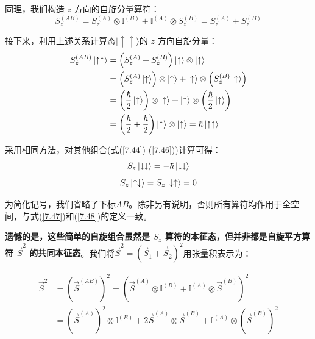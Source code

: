 同理，我们构造 $z$ 方向的自旋分量算符：
\begin{equation}
	S_z^{(AB)} = S_z^{(A)} \otimes \mathbb{I}^{(B)} + \mathbb{I}^{(A)} \otimes S_z^{(B)} = S_z^{(A)} + S_z^{(B)} \label{7.48}
\end{equation}

接下来，利用上述关系计算态\(|\uparrow\uparrow\rangle\)的 $z$ 方向自旋分量：
\begin{equation}
	\begin{aligned}
		S_z^{(AB)} \ket{\uparrow\uparrow} &= \left(S_z^{(A)} + S_z^{(B)}\right) \ket{\uparrow} \otimes \ket{\uparrow} \\
		&= \left(S_z^{(A)} \ket{\uparrow}\right) \otimes \ket{\uparrow} + \ket{\uparrow} \otimes \left(S_z^{(B)} \ket{\uparrow}\right) \\
		&= \left(\frac{\hbar}{2} \ket{\uparrow}\right) \otimes \ket{\uparrow} + \ket{\uparrow} \otimes \left(\frac{\hbar}{2} \ket{\uparrow}\right) \\
		&= \left(\frac{\hbar}{2} + \frac{\hbar}{2}\right) \ket{\uparrow} \otimes \ket{\uparrow} = \hbar \ket{\uparrow\uparrow}
	\end{aligned}
\end{equation}

采用相同方法，对其他组合(式(\ref{7.44})-(\ref{7.46}))计算可得：
\begin{equation}
	S_z \ket{\downarrow\downarrow} = -\hbar \ket{\downarrow\downarrow} \label{7.50}
\end{equation}
\begin{equation}
	S_z \ket{\uparrow\downarrow} = S_z \ket{\downarrow\uparrow} = 0 \label{7.51} 
\end{equation}

为简化记号，我们省略了下标\(AB\)。除非另有说明，否则所有算符均作用于全空间，与式(\ref{7.47})和(\ref{7.48})的定义一致。\par
\textbf{遗憾的是，这些简单的自旋组合虽然是 \(S_z\) 算符的本征态，但并非都是自旋平方算符 \(\vec{S}^2\) 的共同本征态}。我们将\({\vec S^2} = {\left( {{{\vec S}_1} + {{\vec S}_2}} \right)^2}\)用张量积表示为：

\begin{equation}\label{7.52}
	\begin{aligned}
		\vec{S}^2 &= \left(\vec{S}^{(AB)}\right)^2 = \left(\vec{S}^{(A)} \otimes \mathbb{I}^{(B)} + \mathbb{I}^{(A)} \otimes \vec{S}^{(B)}\right)^2 \\
		&= \left(\vec{S}^{(A)}\right)^2 \otimes \mathbb{I}^{(B)} + 2\vec{S}^{(A)} \otimes \vec{S}^{(B)} + \mathbb{I}^{(A)} \otimes \left(\vec{S}^{(B)}\right)^2
	\end{aligned}
\end{equation}

